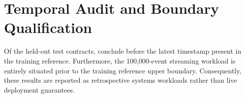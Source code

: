 \documentclass[10pt,journal]{IEEEtran}
\begin{document}
\section{Temporal Audit and Boundary Qualification}
Of the held-out test contracts, \EarlyTestContracts{} conclude before the latest timestamp present in the training reference. Furthermore, the 100,000-event streaming workload is entirely situated prior to the training reference upper boundary. Consequently, these results are reported as retrospective systems workloads rather than live deployment guarantees.



\end{document}
